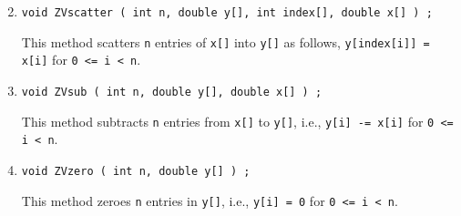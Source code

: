 \begin{enumerate}
$$$$
\item
\begin{verbatim}
void ZVscatter ( int n, double y[], int index[], double x[] ) ;
\end{verbatim}
This method scatters {\tt n} entries of {\tt x[]} into {\tt y[]} 
as follows,
{\tt y[index[i]] = x[i]} 
for {\tt 0 <= i < n}.
\item
\begin{verbatim}
void ZVsub ( int n, double y[], double x[] ) ;
\end{verbatim}
This method subtracts {\tt n} entries from {\tt x[]} to {\tt y[]},
i.e.,
{\tt y[i] -= x[i]}
for {\tt 0 <= i < n}.
\item
\begin{verbatim}
void ZVzero ( int n, double y[] ) ;
\end{verbatim}
This method zeroes {\tt n} entries in {\tt y[]},
i.e.,
{\tt y[i] = 0} 
for {\tt 0 <= i < n}.
\end{enumerate}
